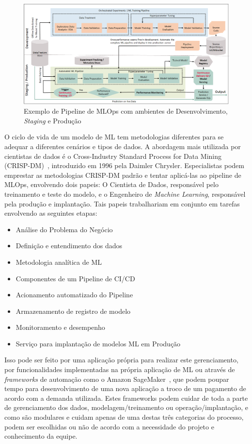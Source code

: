 \documentclass[portugues]{ic-tese}
\begin{document}
\begin{figure}[H]
\centering
\includegraphics[scale=0.33]{images/mlops-pipeline-example.png}
\caption {Exemplo de Pipeline de MLOps com ambientes de Desenvolvimento, \textit{Staging} e Produção~\citep{Tripathi_2021}}
\label{fig:MLOpsPipeline}
\end{figure}

O ciclo de vida de um modelo de ML tem metodologias diferentes para se adequar a diferentes cenários e tipos de dados. A abordagem mais utilizada por cientistas de dados é o Cross-Industry Standard Process for Data Mining (CRISP-DM)~\citep{Shearer_2000}, introduzido em 1996 pela Daimler Chrysler. Especialistas podem emprestar as metodologias CRISP-DM padrão e tentar aplicá-las ao pipeline de MLOps, envolvendo dois papeis: O Cientista de Dados, responsável pelo treinamento e teste do modelo, e o Engenheiro de \textit{Machine Learning}, responsável pela produção e implantação. Tais papeis trabalhariam em conjunto em tarefas envolvendo as seguintes etapas:

\begin{itemize}
    \item Análise do Problema do Negócio
    \item Definição e entendimento dos dados
    \item Metodologia analítica de ML
    \item Componentes de um Pipeline de CI/CD
    \item Acionamento automatizado do Pipeline
    \item Armazenamento de registro de modelo
    \item Monitoramento e desempenho
    \item Serviço para implantação de modelos ML em Produção
\end{itemize}

Isso pode ser feito por uma aplicação própria para realizar este gerenciamento, por funcionalidades implementadas na própria aplicação de ML ou através de \textit{frameworks} de automação como o Amazon SageMaker~\citep{Amazon_2023}, que podem poupar tempo para desenvolvimento de uma nova aplicação a troco de um pagamento de acordo com a demanda utilizada. Estes frameworks podem cuidar de toda a parte de gerenciamento dos dados, modelagem/treinamento ou operação/implantação, e como são modulares e cuidam apenas de uma destas três categorias do processo, podem ser escolhidas ou não de acordo com a necessidade do projeto e conhecimento da equipe.
\end{document}
